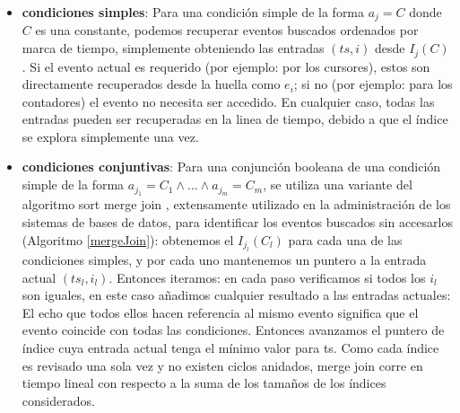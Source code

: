 \documentclass[12pt,legalpaper]{report}
\begin{document}
\begin{itemize}
	\item \textbf{condiciones simples}: Para una condición simple de la forma $a_j = C$ donde $C$ es una constante, podemos recuperar eventos buscados ordenados por marca de tiempo, simplemente obteniendo las entradas $(ts,i)$ desde $I_j(C)$.  Si el evento actual es requerido (por ejemplo: por los cursores), estos son directamente recuperados desde la huella como $e_i$; si no (por ejemplo: para los contadores) el evento no necesita ser accedido.  En cualquier caso, todas las entradas pueden ser recuperadas en la linea de tiempo, debido a que el índice se explora simplemente una vez.

	\item \textbf{condiciones conjuntivas}: Para una conjunción booleana de una condición simple de la forma $a_{j_{1}} = C_1 \wedge \dots \wedge a_{j_{m}} = C_m$, se utiliza una variante del algoritmo sort merge join \cite{sard}, extensamente utilizado en la administración de los sistemas de bases de datos, para identificar los eventos buscados sin accesarlos (Algoritmo \ref{mergeJoin}):  obtenemos el $I_{j_l} (C_l)$ para cada una de las condiciones simples, y por cada uno mantenemos un puntero a la entrada actual $(ts_l,i_l)$.  Entonces iteramos: en cada paso verificamos si todos los $i_l$ son iguales, en este caso añadimos cualquier resultado a las entradas actuales:  El echo que todos ellos hacen referencia al mismo evento significa que el evento coincide con todas las condiciones.  Entonces avanzamos el puntero de índice cuya entrada actual tenga el mínimo valor para ts.  Como cada índice es revisado una sola vez y no existen ciclos anidados, merge join corre en tiempo lineal con respecto a la suma de los tamaños de los índices considerados.


\end{itemize}
\end{document}

